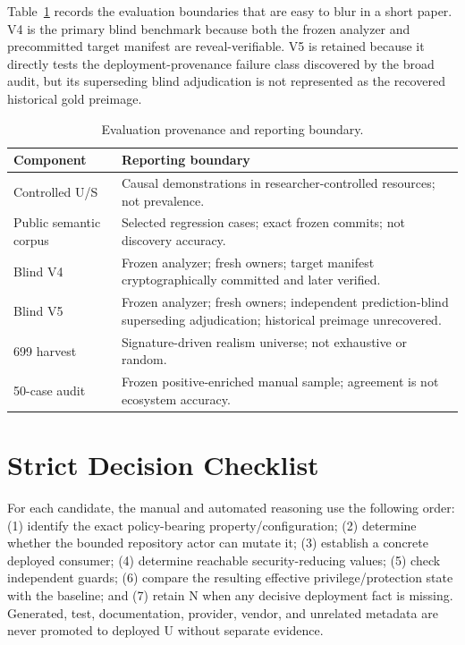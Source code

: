 \documentclass[sigconf,review,anonymous]{acmart}
\newcommand{\U}{\textsf{U}}
\newcommand{\N}{\textsf{N}}
\begin{document}
Table~\ref{tab:prov} records the evaluation boundaries that are easy to blur in
a short paper.  V4 is the primary blind benchmark because both the frozen
analyzer and precommitted target manifest are reveal-verifiable.  V5 is retained
because it directly tests the deployment-provenance failure class discovered by
the broad audit, but its superseding blind adjudication is not represented as
the recovered historical gold preimage.

\begin{table}[h]
\caption{Evaluation provenance and reporting boundary.}
\label{tab:prov}
\small
\begin{tabularx}{\columnwidth}{@{}l X@{}}
\toprule
Component & Reporting boundary \\
\midrule
Controlled U/S & Causal demonstrations in researcher-controlled resources; not prevalence. \\
Public semantic corpus & Selected regression cases; exact frozen commits; not discovery accuracy. \\
Blind V4 & Frozen analyzer; fresh owners; target manifest cryptographically committed and later verified. \\
Blind V5 & Frozen analyzer; fresh owners; independent prediction-blind superseding adjudication; historical preimage unrecovered. \\
699 harvest & Signature-driven realism universe; not exhaustive or random. \\
50-case audit & Frozen positive-enriched manual sample; agreement is not ecosystem accuracy. \\
\bottomrule
\end{tabularx}
\end{table}

\section{Strict Decision Checklist}

For each candidate, the manual and automated reasoning use the following order:
(1) identify the exact policy-bearing property/configuration; (2) determine
whether the bounded repository actor can mutate it; (3) establish a concrete
deployed consumer; (4) determine reachable security-reducing values; (5) check
independent guards; (6) compare the resulting effective privilege/protection
state with the baseline; and (7) retain \N{} when any decisive deployment fact
is missing.  Generated, test, documentation, provider, vendor, and unrelated
metadata are never promoted to deployed \U{} without separate evidence.
\end{document}

